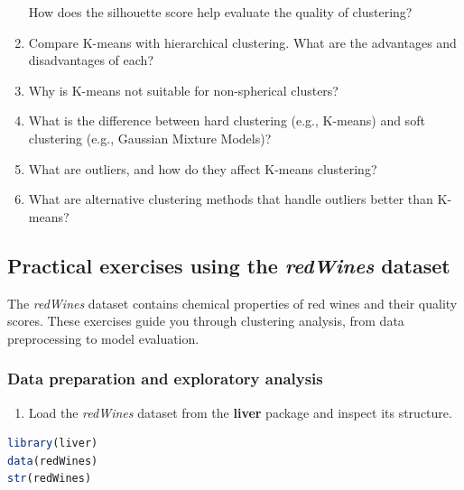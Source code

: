 \documentclass[
]{book}
\providecommand{\tightlist}{%
  \setlength{\itemsep}{0pt}\setlength{\parskip}{0pt}}
\theoremstyle{definition}
\theoremstyle{definition}
\theoremstyle{definition}
\theoremstyle{definition}
\theoremstyle{remark}
\begin{document}
\begin{enumerate}
  How does the silhouette score help evaluate the quality of clustering?\\
\item
  Compare K-means with hierarchical clustering. What are the advantages and disadvantages of each?\\
\item
  Why is K-means not suitable for non-spherical clusters?\\
\item
  What is the difference between hard clustering (e.g., K-means) and soft clustering (e.g., Gaussian Mixture Models)?\\
\item
  What are outliers, and how do they affect K-means clustering?\\
\item
  What are alternative clustering methods that handle outliers better than K-means?
\end{enumerate}

\subsection*{\texorpdfstring{Practical exercises using the \emph{redWines} dataset}{Practical exercises using the redWines dataset}}\label{practical-exercises-using-the-redwines-dataset-1}

The \emph{redWines} dataset contains chemical properties of red wines and their quality scores. These exercises guide you through clustering analysis, from data preprocessing to model evaluation.

\subsubsection*{Data preparation and exploratory analysis}\label{data-preparation-and-exploratory-analysis}

\begin{enumerate}
\def\labelenumi{\arabic{enumi}.}
\setcounter{enumi}{20}
\tightlist
\item
  Load the \emph{redWines} dataset from the \textbf{liver} package and inspect its structure.\\
\end{enumerate}

\begin{lstlisting}[language=R]
library(liver)
data(redWines)
str(redWines)
\end{lstlisting}
\end{document}
